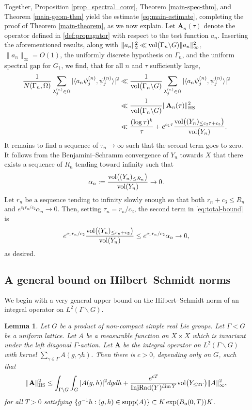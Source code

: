 \documentclass[12pt]{amsart}
\newtheorem{lemma}[theorem]{Lemma}
\theoremstyle{remark}
\newcommand{\ga}{\mathfrak a}
\begin{document}
Together, Proposition \ref{prop_spectral_conv}, Theorem \ref{main-spec-thm}, and Theorem \ref{main-geom-thm} yield the estimate \eqref{eq:main-estimate}, completing the proof of Theorem \ref{main-theorem}, as we now explain. Let $\mathbf{A}_n(\tau)$ denote the operator defined in \eqref{def:propagator} with respect to the test function $a_n$. Inserting the aforementioned results, along with $\|a_n\|_2^2\ll {\rm vol}\big(\Gamma_n\backslash G)\|a_n\|_\infty^2$, $\|a_n\|_\infty=O(1)$, the uniformly discrete hypothesis on $\Gamma_n$, and the uniform spectral gap for $G_1$, we find, that for all $n$ and $\tau$ sufficiently large,
\begin{align}
\frac{1}{N(\Gamma_n,\Omega)}\sum_{\lambda_j^{(n)}\in\Omega} |\langle a_n\psi_j^{(n)},\psi_j^{(n)}\rangle|^2&\ll \frac{1}{{\rm vol}\big(\Gamma_n\backslash G)}\sum_{\lambda_j^{(n)}\in\Omega} |\langle a_n\psi_j^{(n)},\psi_j^{(n)}\rangle|^2\nonumber\\
&\ll \frac{1}{{\rm vol}\big(\Gamma_n\backslash G)}\|\mathbf{A}_n(\tau)\|_{\rm HS}^2\nonumber\\
&\ll \frac{(\log\tau)^k}{\tau}+e^{c_1\tau}\frac{{\rm vol}\big( (Y_n)_{\le c_2\tau +c_3}\big)}{{\rm vol}\big(Y_n)}. \label{eq:total-bound}
\end{align}
It remains to find a sequence of $\tau_n\to\infty$ such that the second term goes to zero. It follows from the Benjamini--Schramm convergence of $Y_n$ towards $X$ that there exists a sequence of $R_n$ tending toward infinity such that 
\[
\alpha_n:=\frac{{\rm vol}\big( (Y_n)_{\le R_n}\big)}{{\rm vol}(Y_n)}\rightarrow 0.
\]
Let $r_n$ be a sequence tending to infinity slowly enough so that both $r_n+c_3\leq R_n$ and $e^{c_1 r_n/c_2}\alpha_n\rightarrow 0$. Then, setting $\tau_n=r_n/c_2$, the second term in \eqref{eq:total-bound} is
\[
e^{c_1 r_n/c_2}\frac{{\rm vol}\big( (Y_n)_{\le r_n+c_3}\big)}{{\rm vol}(Y_n)}\leq e^{c_1r_n/c_2}\alpha_n\rightarrow 0,
\]
as desired.

\subsection{A general bound on Hilbert--Schmidt norms}

We begin with a very general upper bound on the Hilbert--Schmidt norm of an integral operator on $L^2(\Gamma\backslash G)$.

\begin{lemma}\label{lemma:general-HS}
Let $G$ be a product of non-compact simple real Lie groups. Let $\Gamma < G$ be a uniform lattice. Let $A$ be a measurable function on $X\times X$ which is invariant under the left diagonal $\Gamma$-action. Let $\mathbf{A}$ be the integral operator on $L^2(\Gamma\backslash G)$ with kernel $\sum_{\gamma\in\Gamma}A(g,\gamma h)$. Then there is $c>0$, depending only on $G$, such that
\[
\|\mathbf{A}\|_{\rm HS}^2\le \int_{\Gamma\backslash G}\int_G|A(g,h)|^2dg dh+ \frac{e^{cT}}{{\rm InjRad}(Y)^{\dim Y}} {\rm vol}\big( Y_{\le 2T}\big)\|A\|_\infty^2,
\]
for all $T > 0$ satisfying $\{g^{-1}h: (g,h)\in {\rm supp}(A)\}\subset K\exp(B_\ga (0,T))K$. 
\end{lemma}
\end{document}
